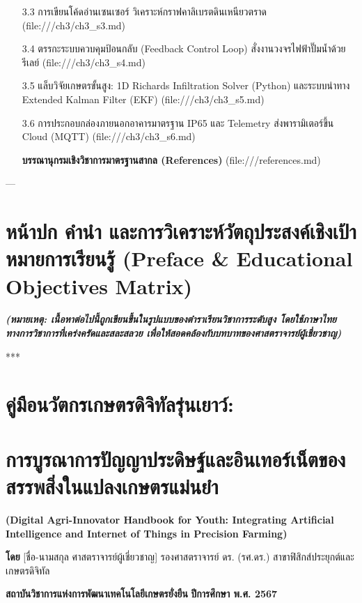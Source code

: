 \documentclass[11pt,a4paper,openany]{report}
\begin{document}
\begin{itemize}
  \item [3.3 การเขียนโค้ดอ่านเซนเซอร์ วิเคราะห์กราฟคาลิเบรตดินเหนียวตราด](file:///ch3/ch3\_s3.md)
  \item [3.4 ตรรกะระบบควบคุมป้อนกลับ (Feedback Control Loop) สั่งงานวงจรไฟฟ้าปั๊มน้ำด้วยรีเลย์](file:///ch3/ch3\_s4.md)
  \item [3.5 แล็บวิจัยเกษตรขั้นสูง: 1D Richards Infiltration Solver (Python) และระบบนำทาง Extended Kalman Filter (EKF)](file:///ch3/ch3\_s5.md)
  \item [3.6 การประกอบกล่องภายนอกอาคารมาตรฐาน IP65 และ Telemetry ส่งพารามิเตอร์ขึ้น Cloud (MQTT)](file:///ch3/ch3\_s6.md)
  \item [\textbf{บรรณานุกรมเชิงวิชาการมาตรฐานสากล (References)}](file:///references.md)
\end{itemize}



---

\chapter*{หน้าปก คำนำ และการวิเคราะห์วัตถุประสงค์เชิงเป้าหมายการเรียนรู้ (Preface \& Educational Objectives Matrix)}


\textit{\textbf{(หมายเหตุ: เนื้อหาต่อไปนี้ถูกเขียนขึ้นในรูปแบบของตำราเรียนวิชาการระดับสูง โดยใช้ภาษาไทยทางการวิชาการที่เคร่งครัดและสละสลวย เพื่อให้สอดคล้องกับบทบาทของศาสตราจารย์ผู้เชี่ยวชาญ)}}

***

\chapter{คู่มือนวัตกรเกษตรดิจิทัลรุ่นเยาว์:}

\chapter{การบูรณาการปัญญาประดิษฐ์และอินเทอร์เน็ตของสรรพสิ่งในแปลงเกษตรแม่นยำ}

\textbf{(Digital Agri-Innovator Handbook for Youth: Integrating Artificial Intelligence and Internet of Things in Precision Farming)}

\textbf{โดย}
[ชื่อ-นามสกุล ศาสตราจารย์ผู้เชี่ยวชาญ]
รองศาสตราจารย์ ดร. (รศ.ดร.) สาขาฟิสิกส์ประยุกต์และเกษตรดิจิทัล

\textbf{สถาบันวิชาการแห่งการพัฒนาเทคโนโลยีเกษตรยั่งยืน}
\textbf{ปีการศึกษา พ.ศ. 2567}
\end{document}
